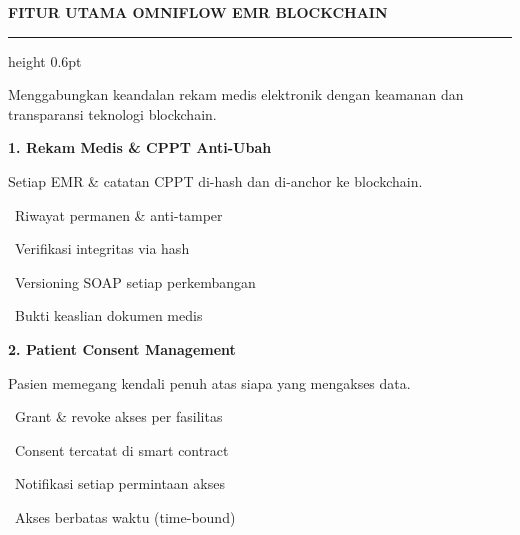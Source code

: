 \documentclass[a4paper]{article}
\newcommand{\sectiontitle}[1]{%
    \vspace{10pt}%
    {\fontsize{13}{16}\selectfont\bfseries\color{BlueDark} #1}\par\vspace{3pt}%
    {\color{BluePrimary}\hrule height 0.6pt}\par\vspace{8pt}%
}
\begin{document}
\setlength{\parskip}{2pt}

\sectiontitle{FITUR UTAMA OMNIFLOW EMR BLOCKCHAIN}

{\fontsize{9.5}{13}\selectfont\color{TextLight}
Menggabungkan keandalan rekam medis elektronik dengan keamanan dan transparansi teknologi blockchain.}

\vspace{6pt}

\noindent
\begin{minipage}[t]{0.485\textwidth}
    \colorbox{BluePrimary}{%
        \begin{minipage}{\dimexpr\textwidth-2\fboxsep\relax}
            {\fontsize{10}{13}\selectfont\bfseries\color{White} 1. Rekam Medis \& CPPT Anti-Ubah}
        \end{minipage}}\par
    \vspace{4pt}
    {\fontsize{9}{12}\selectfont\color{TextDark}%
    Setiap EMR \& catatan CPPT di-hash dan di-anchor ke blockchain.\par\vspace{3pt}
    \textbullet\ Riwayat permanen \& anti-tamper\par\vspace{2pt}%
    \textbullet\ Verifikasi integritas via hash\par\vspace{2pt}%
    \textbullet\ Versioning SOAP setiap perkembangan\par\vspace{2pt}%
    \textbullet\ Bukti keaslian dokumen medis}%
\end{minipage}%
\hfill
\begin{minipage}[t]{0.485\textwidth}
    \colorbox{EmeraldPrimary}{%
        \begin{minipage}{\dimexpr\textwidth-2\fboxsep\relax}
            {\fontsize{10}{13}\selectfont\bfseries\color{White} 2. Patient Consent Management}
        \end{minipage}}\par
    \vspace{4pt}
    {\fontsize{9}{12}\selectfont\color{TextDark}%
    Pasien memegang kendali penuh atas siapa yang mengakses data.\par\vspace{3pt}
    \textbullet\ Grant \& revoke akses per fasilitas\par\vspace{2pt}%
    \textbullet\ Consent tercatat di smart contract\par\vspace{2pt}%
    \textbullet\ Notifikasi setiap permintaan akses\par\vspace{2pt}%
    \textbullet\ Akses berbatas waktu (time-bound)}%
\end{minipage}
\end{document}
